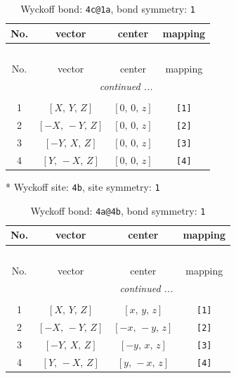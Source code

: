 \documentclass[fleqn,8pt]{jsarticle}
\begin{document}
\renewcommand{\arraystretch}{1.2}
\begin{longtable}{cccc}
\caption{Wyckoff bond: {\tt 4c@1a}, bond symmetry: {\tt 1}}
 \\
 \hline \hline
No. & vector & center & mapping \\ \hline \endfirsthead

\multicolumn{3}{l}{\tablename\ \thetable{}} \\
 \hline \hline
No. & vector & center & mapping \\ \hline \endhead

 \hline \hline
\multicolumn{3}{r}{\footnotesize\it continued ...} \\ \endfoot

 \hline \hline
\multicolumn{3}{r}{} \\ \endlastfoot

1 & $\left[ X,\, Y,\, Z \right]$ & $\left[ 0,\, 0,\, z \right]$ & {\tt [1]} \\ \hline
2 & $\left[ - X,\, - Y,\, Z \right]$ & $\left[ 0,\, 0,\, z \right]$ & {\tt [2]} \\ \hline
3 & $\left[ - Y,\, X,\, Z \right]$ & $\left[ 0,\, 0,\, z \right]$ & {\tt [3]} \\ \hline
4 & $\left[ Y,\, - X,\, Z \right]$ & $\left[ 0,\, 0,\, z \right]$ & {\tt [4]} \\
\end{longtable}
* Wyckoff site: {\tt 4b}, site symmetry: {\tt 1}
\renewcommand{\arraystretch}{1.2}
\begin{longtable}{cccc}
\caption{Wyckoff bond: {\tt 4a@4b}, bond symmetry: {\tt 1}}
 \\
 \hline \hline
No. & vector & center & mapping \\ \hline \endfirsthead

\multicolumn{3}{l}{\tablename\ \thetable{}} \\
 \hline \hline
No. & vector & center & mapping \\ \hline \endhead

 \hline \hline
\multicolumn{3}{r}{\footnotesize\it continued ...} \\ \endfoot

 \hline \hline
\multicolumn{3}{r}{} \\ \endlastfoot

1 & $\left[ X,\, Y,\, Z \right]$ & $\left[ x,\, y,\, z \right]$ & {\tt [1]} \\ \hline
2 & $\left[ - X,\, - Y,\, Z \right]$ & $\left[ - x,\, - y,\, z \right]$ & {\tt [2]} \\ \hline
3 & $\left[ - Y,\, X,\, Z \right]$ & $\left[ - y,\, x,\, z \right]$ & {\tt [3]} \\ \hline
4 & $\left[ Y,\, - X,\, Z \right]$ & $\left[ y,\, - x,\, z \right]$ & {\tt [4]} \\
\end{longtable}
\end{document}
